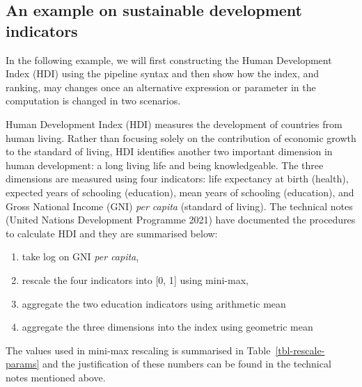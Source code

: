 \documentclass[
]{article}
\providecommand{\tightlist}{%
  \setlength{\itemsep}{0pt}\setlength{\parskip}{0pt}}\usepackage{longtable,booktabs,array}
\begin{document}
\newpage

\hypertarget{an-example-on-sustainable-development-indicators}{%
\subsection{An example on sustainable development
indicators}\label{an-example-on-sustainable-development-indicators}}

In the following example, we will first constructing the Human
Development Index (HDI) using the pipeline syntax and then show how the
index, and ranking, may changes once an alternative expression or
parameter in the computation is changed in two scenarios.

Human Development Index (HDI) measures the development of countries from
human living. Rather than focusing solely on the contribution of
economic growth to the standard of living, HDI identifies another two
important dimension in human development: a long living life and being
knowledgeable. The three dimensions are measured using four indicators:
life expectancy at birth (health), expected years of schooling
(education), mean years of schooling (education), and Gross National
Income (GNI) \emph{per capita} (standard of living). The technical notes
(United Nations Development Programme 2021) have documented the
procedures to calculate HDI and they are summarised below:

\begin{enumerate}
\def\labelenumi{\arabic{enumi}.}
\tightlist
\item
  take log on GNI \emph{per capita},
\item
  rescale the four indicators into {[}0, 1{]} using mini-max,
\item
  aggregate the two education indicators using arithmetic mean
\item
  aggregate the three dimensions into the index using geometric mean
\end{enumerate}

The values used in mini-max rescaling is summarised in
Table~\ref{tbl-rescale-params} and the justification of these numbers
can be found in the technical notes mentioned above.
\end{document}
